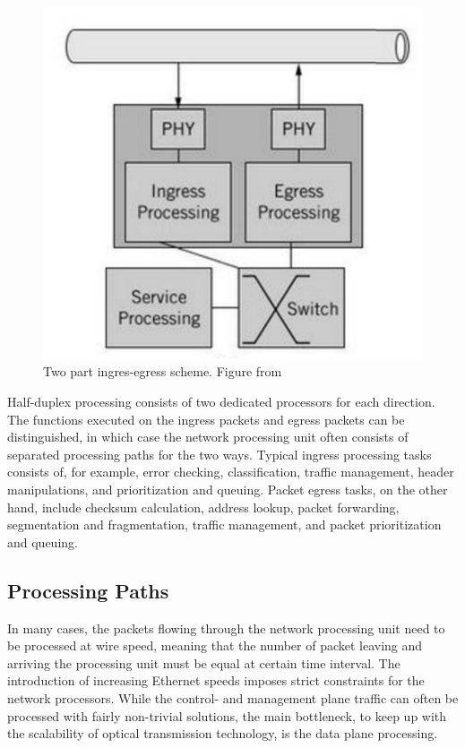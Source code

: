 \begin{figure}[]
  \begin{center}
    \includegraphics[width=.6\textwidth]{images/ingress-egress.pdf}
    \caption{Two part ingres-egress scheme. Figure from~\cite{Giladi:2008:Network}}
    \label{fig:ingress-egress}
  \end{center}
\end{figure}

Half-duplex processing consists of two dedicated processors for each direction. The functions executed on the ingress packets and egress packets can be distinguished, in which case the network processing unit often consists of separated processing paths for the two ways. Typical ingress processing tasks consists of, for example, error checking, classification, traffic management, header manipulations, and prioritization and queuing. Packet egress tasks, on the other hand, include checksum calculation, address lookup, packet forwarding, segmentation and fragmentation, traffic management, and packet prioritization and queuing.~\cite{Giladi:2008:Network}

\subsection{Processing Paths}
In many cases, the packets flowing through the network processing unit need to be processed at wire speed, meaning that the number of packet leaving and arriving the processing unit must be equal at certain time interval. The introduction of increasing Ethernet speeds imposes strict constraints for the network processors. While the control- and management plane traffic can often be processed with fairly non-trivial solutions, the main bottleneck, to keep up with the scalability of optical transmission technology, is the data plane processing.~\cite{Giladi:2008:Network}

